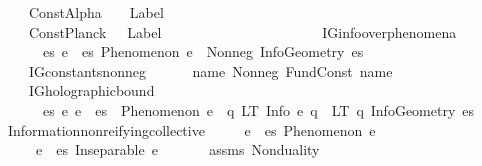 \begin{isabellebody}
\ \ \ \ ConstAlpha\ \ \ {\isacharcolon}{\kern0pt}{\isacharcolon}{\kern0pt}\ {\isachardoublequoteopen}Label{\isachardoublequoteclose}\ \ \ \ \ \ \ \ \ \ \ \ \ \ \isanewline
\ \ \ \ ConstPlanck\ \ {\isacharcolon}{\kern0pt}{\isacharcolon}{\kern0pt}\ {\isachardoublequoteopen}Label{\isachardoublequoteclose}\ \ \ \ \ \ \ \ \ \ \ \ \ \ \isanewline
\isanewline
\ \ \isamarkupfalse%
\ \isanewline
\ \ \ \ IG{}{\isacharunderscore}{\kern0pt}info{\isacharunderscore}{\kern0pt}over{\isacharunderscore}{\kern0pt}phenomena{\isacharcolon}{\kern0pt}\isanewline
\ \ \ \ \ \ {\isachardoublequoteopen}{\isasymforall}es{\isachardot}{\kern0pt}\ {\isacharparenleft}{\kern0pt}{\isasymforall}e\ {\isasymin}\ es{\isachardot}{\kern0pt}\ Phenomenon\ e{\isacharparenright}{\kern0pt}\ {\isasymlongrightarrow}\ Nonneg\ {\isacharparenleft}{\kern0pt}InfoGeometry\ es{\isacharparenright}{\kern0pt}{\isachardoublequoteclose}\ \isanewline
\ \ \ \ IG{}{\isacharunderscore}{\kern0pt}constants{\isacharunderscore}{\kern0pt}nonneg{\isacharcolon}{\kern0pt}\isanewline
\ \ \ \ \ \ {\isachardoublequoteopen}{\isasymforall}name{\isachardot}{\kern0pt}\ Nonneg\ {\isacharparenleft}{\kern0pt}FundConst\ name{\isacharparenright}{\kern0pt}{\isachardoublequoteclose}\ \isanewline
\ \ \ \ IG{}{\isacharunderscore}{\kern0pt}holographic{\isacharunderscore}{\kern0pt}bound{\isacharcolon}{\kern0pt}\isanewline
\ \ \ \ \ \ {\isachardoublequoteopen}{\isasymforall}es\ e{\isachardot}{\kern0pt}\ e\ {\isasymin}\ es\ {\isasymand}\ Phenomenon\ e\ {\isasymlongrightarrow}\ {\isacharparenleft}{\kern0pt}{\isasymexists}q{\isachardot}{\kern0pt}\ LT\ {\isacharparenleft}{\kern0pt}Info\ e{\isacharparenright}{\kern0pt}\ q\ {\isasymand}\ LT\ q\ {\isacharparenleft}{\kern0pt}InfoGeometry\ es{\isacharparenright}{\kern0pt}{\isacharparenright}{\kern0pt}{\isachardoublequoteclose}\isanewline
\isanewline
\ \ \isamarkupfalse%
\ Information{\isacharunderscore}{\kern0pt}nonreifying{\isacharunderscore}{\kern0pt}collective{\isacharcolon}{\kern0pt}\isanewline
\ \ \ \ \ {\isachardoublequoteopen}{\isasymforall}e\ {\isasymin}\ es{\isachardot}{\kern0pt}\ Phenomenon\ e{\isachardoublequoteclose}\isanewline
\ \ \ \ \ {\isachardoublequoteopen}{\isasymforall}e\ {\isasymin}\ es{\isachardot}{\kern0pt}\ Inseparable\ e\ {\isasymOmega}{\isachardoublequoteclose}\isanewline
%
\isadelimproof
\ \ \ \ %
\endisadelimproof
%
\isatagproof
{}\isamarkupfalse%
\ assms\ Nonduality\ \isamarkupfalse%

\end{isabellebody}
